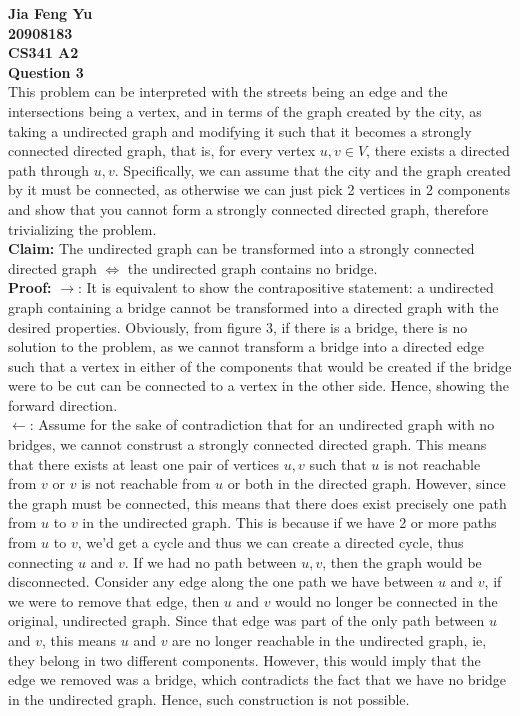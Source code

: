 \documentclass[12pt]{article}
\begin{document}
	\textbf{
		{\Large Jia Feng Yu \\ 20908183\\ CS341 A2 \\ Question 3}
	}\\
	This problem can be interpreted with the streets being an edge and the intersections being a vertex, and in terms of the graph created by the city, as taking a undirected graph and modifying it such that it becomes a strongly connected directed graph, that is, for every vertex $u,v \in V$, there exists a directed path through $u,v$. Specifically, we can assume that the city and the graph created by it must be connected, as otherwise we can just pick 2 vertices in 2 components and show that you cannot form a strongly connected directed graph, therefore trivializing the problem. \\
	\textbf{Claim:} The undirected graph can be transformed into a strongly connected directed graph $\Leftrightarrow$ the undirected graph contains no bridge.\\ 
	\textbf{Proof: }$\rightarrow$: It is equivalent to show the contrapositive statement: a undirected graph containing a bridge cannot be transformed into a directed graph with the desired properties. Obviously, from figure 3, if there is a bridge, there is no solution to the problem, as we cannot transform a bridge into a directed edge such that a vertex in either of the components that would be created if the bridge were to be cut can be connected to a vertex in the other side. Hence, showing the forward direction.\\
	$\leftarrow$: Assume for the sake of contradiction that for an undirected graph with no bridges, we cannot construst a strongly connected directed graph. This means that there exists at least one pair of vertices $u, v$ such that $u$ is not reachable from $v$ or $v$ is not reachable from $u$ or both in the directed graph. However, since the graph must be connected, this means that there does exist precisely one path from $u$ to $v$ in the undirected graph. This is because if we have 2 or more paths from $u$ to $v$, we'd get a cycle and thus we can create a directed cycle, thus connecting $u$ and $v$. If we had no path between $u,v$, then the graph would be disconnected. Consider any edge along the one path we have between $u$ and $v$, if we were to remove that edge, then $u$ and $v$ would no longer be connected in the original, undirected graph. Since that edge was part of the only path between $u$ and $v$, this means $u$ and $v$ are no longer reachable in the undirected graph, ie, they belong in two different components. However, this would imply that the edge we removed was a bridge, which contradicts the fact that we have no bridge in the undirected graph. Hence, such construction is not possible.\\
\end{document}
